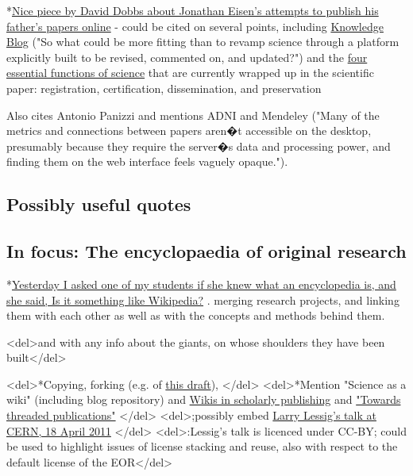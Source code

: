 \documentclass[final,authoryear,3p]{elsarticle-open-drafting}
\begin{document}
*\href{http://www.wired.com/wiredscience/2011/05/free-science-one-paper-at-a-time-2/all/1}{Nice piece by David Dobbs about Jonathan Eisen's attempts to publish his father's papers online} - could be cited on several points, including \href{http://knowledgeblog.org/}{Knowledge Blog} ("So what could be more fitting than to revamp science through a platform explicitly built to be revised, commented on, and updated?") and the \href{http://www.ariadne.ac.uk/issue7/fytton/}{four essential functions of science} that are currently wrapped up in the scientific paper: registration, certification, dissemination, and preservation

Also cites Antonio Panizzi and mentions ADNI and Mendeley ("Many of the metrics and connections between papers aren�t accessible on the desktop, presumably because they require the server�s data and processing power, and finding them on the web interface feels vaguely opaque.").

\subsection{Possibly useful quotes}


\subsection{In focus: The encyclopaedia of original research}

*\href{http://twitter.com/#!/egonwillighagen/statuses/39097468700336128}{Yesterday I asked one of my students if she knew what an encyclopedia is, and she said, Is it something like Wikipedia?}
. merging research projects, and linking them with each other as well as with the concepts and methods behind them.

<del>and with any info about the giants, on whose shoulders they have been built</del>

<del>*Copying, forking (e.g. of \href{http://species-id.net/w/index.php?title=Draft:Encyclopaedia_of_original_research&diff=prev&oldid=5076}{this draft}), </del>
<del>*Mention "Science as a wiki" (including blog repository) and \href{http://species-id.net/wiki/Wikis_in_scholarly_publishing}{Wikis in scholarly publishing} and \href{http://friendfeed.com/cameronneylon/c476db70/imo-this-is-possibly-single-most-useful-thing-we}{"Towards threaded publications"} </del>
<del>;possibly embed \href{http://vimeo.com/22633948}{Larry Lessig's talk at CERN, 18 April 2011} </del>
<del>:Lessig's talk is licenced under CC-BY; could be used to highlight issues of license stacking and reuse, also with respect to the default license of the EOR</del>
\end{document}
